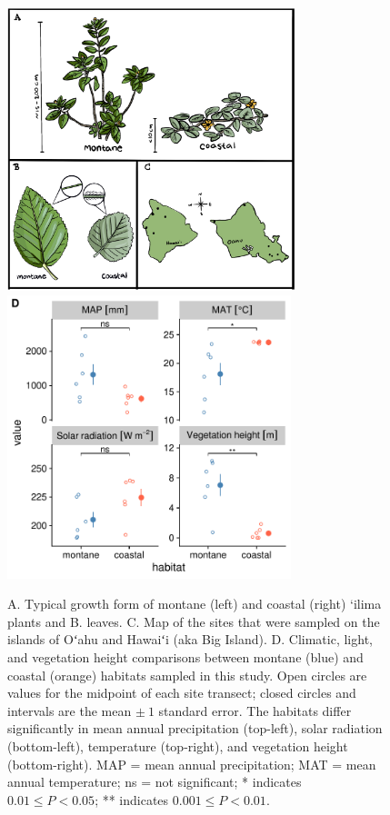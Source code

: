\documentclass[
  letterpaper,
  DIV=11,
  numbers=noendperiod]{scrartcl}
\begin{document}
\begin{figure}[H]
  \includegraphics[height=3.25in]{../figures/study-system.pdf}
  \includegraphics[height=3.25in]{../figures/habitat-climate.pdf}
  \caption{A. Typical growth form of montane (left) and coastal (right) ‘ilima plants and B. leaves. C. Map of the sites that were sampled on the islands of Oʻahu and Hawaiʻi (aka Big Island). D. Climatic, light, and vegetation height comparisons between montane (blue) and coastal (orange) habitats sampled in this study. Open circles are values for the midpoint of each site transect; closed circles and intervals are the mean $\pm~1$ standard error. The habitats differ significantly in mean annual precipitation (top-left), solar radiation (bottom-left), temperature (top-right), and vegetation height (bottom-right). MAP = mean annual precipitation; MAT = mean annual temperature; ns = not significant; * indicates $0.01 \le P < 0.05$; ** indicates $0.001 \le P < 0.01$.}
  \label{fig:study-system}
\end{figure}
\end{document}
